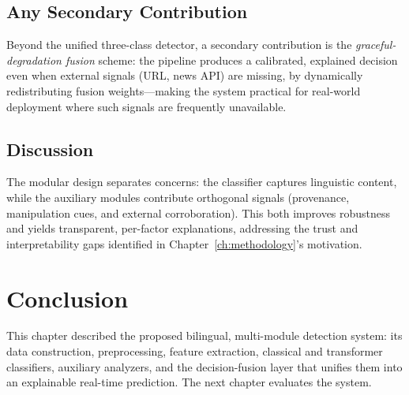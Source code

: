\subsection{Any Secondary Contribution}
Beyond the unified three-class detector, a secondary contribution is the
\emph{graceful-degradation fusion} scheme: the pipeline produces a calibrated,
explained decision even when external signals (URL, news API) are missing, by
dynamically redistributing fusion weights---making the system practical for
real-world deployment where such signals are frequently unavailable.

\subsection{Discussion}
The modular design separates concerns: the classifier captures linguistic
content, while the auxiliary modules contribute orthogonal signals (provenance,
manipulation cues, and external corroboration). This both improves robustness and
yields transparent, per-factor explanations, addressing the trust and
interpretability gaps identified in Chapter~\ref{ch:methodology}'s motivation.

\section{Conclusion}
This chapter described the proposed bilingual, multi-module detection system: its
data construction, preprocessing, feature extraction, classical and transformer
classifiers, auxiliary analyzers, and the decision-fusion layer that unifies them
into an explainable real-time prediction. The next chapter evaluates the system.
